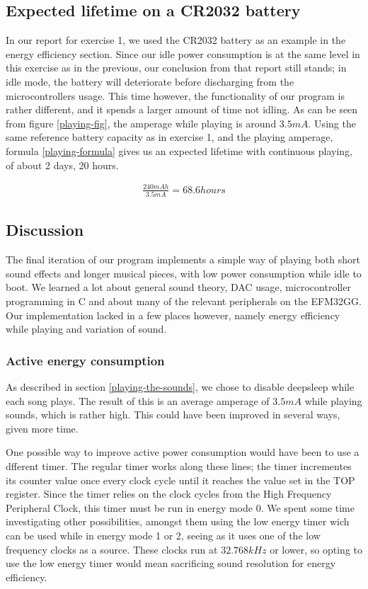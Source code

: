 \subsection{Expected lifetime on a CR2032 battery}

In our report for exercise 1, we used the CR2032 battery as an example in the energy efficiency section. \cite[p.~13]{exercise1report} Since our idle power consumption is at the same level in this exercise as in the previous, our conclusion from that report still stands; in idle mode, the battery will deteriorate before discharging from the microcontrollers usage. This time however, the functionality of our program is rather different, and it spends a larger amount of time not idling. As can be seen from figure \ref{playing-fig}, the amperage while playing is around $3.5mA$. Using the same reference battery capacity \cite{cr2032} as in exercise 1, and the playing amperage, formula \ref{playing-formula} gives us an expected lifetime with continuous playing, of about 2 days, 20 hours.

\begin{gather}
\label{playing-formula}
\frac{240mAh}{3.5mA} = 68.6 hours
\end{gather}

\subsection{Discussion}

The final iteration of our program implements a simple way of playing both short sound effects and longer musical pieces, with low power consumption while idle to boot. We learned a lot about general sound theory, DAC usage, microcontroller programming in C and about many of the relevant peripherals on the EFM32GG. Our implementation lacked in a few places however, namely energy efficiency while playing and variation of sound.

\subsubsection{Active energy consumption}

As described in section \ref{playing-the-sounds}, we chose to disable deepsleep while each song plays. The result of this is an average amperage of $3.5mA$ while playing sounds, which is rather high. This could have been improved in several ways, given more time.

One possible way to improve active power consumption would have been to use a dfferent timer. The regular timer works along these lines; the timer incrementes its counter value once every clock cycle until it reaches the value set in the TOP register. Since the timer relies on the clock cycles from the High Frequency Peripheral Clock, this timer must be run in energy mode 0. We spent some time investigating other possibilities, amongst them using the low energy timer wich can be used while in energy mode 1 or 2, seeing as it uses one of the low frequency clocks as a source. These clocks run at $32.768 kHz$ or lower, so opting to use the low energy timer would mean sacrificing sound resolution for energy efficiency.

